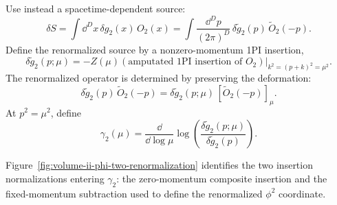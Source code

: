 Use instead a spacetime-dependent source:
\[
  \delta S
  =
  \int\dd^D x\,\delta g_2(x)\,O_2(x)
  =
  \int\frac{\dd^Dp}{(2\pi)^D}\,
  \delta\widetilde g_2(p)\,\widetilde O_2(-p).
\]
Define the renormalized source by a nonzero-momentum 1PI insertion,
\[
  \delta\widetilde g_2(p;\mu)
  =
  -Z(\mu)
  \left(\text{amputated 1PI insertion of }O_2\right)
  \bigg|_{k^2=(p+k)^2=\mu^2}.
\]
The renormalized operator is determined by preserving the deformation:
\[
  \delta\widetilde g_2(p)\,\widetilde O_2(-p)
  =
  \delta\widetilde g_2(p;\mu)\,[\widetilde O_2(-p)]_\mu.
\]
At \(p^2=\mu^2\), define
\[
  \gamma_2(\mu)
  =
  \frac{\dd}{\dd\log\mu}
  \log
  \left(
    \frac{\delta\widetilde g_2(p;\mu)}
         {\delta\widetilde g_2(p)}
  \right).
\]

Figure~\ref{fig:volume-ii-phi-two-renormalization} identifies the two insertion
normalizations entering \(\gamma_2\): the zero-momentum composite insertion and
the fixed-momentum subtraction used to define the renormalized \(\phi^2\)
coordinate.

